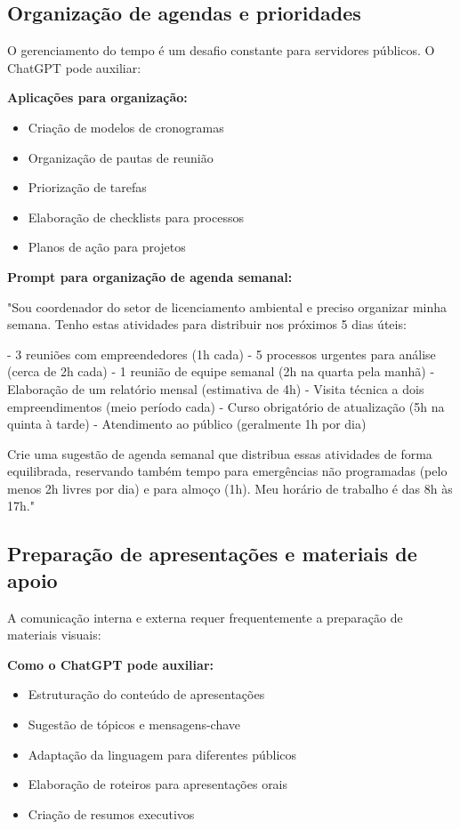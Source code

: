 \documentclass[12pt,a4paper]{book}
\begin{document}
\subsection{Organização de agendas e prioridades}

O gerenciamento do tempo é um desafio constante para servidores públicos. O ChatGPT pode auxiliar:

\textbf{Aplicações para organização:}
\begin{itemize}
    \item Criação de modelos de cronogramas
    \item Organização de pautas de reunião
    \item Priorização de tarefas
    \item Elaboração de checklists para processos
    \item Planos de ação para projetos
\end{itemize}

\begin{tcolorbox}[exemplo]
\textbf{Prompt para organização de agenda semanal:}

"Sou coordenador do setor de licenciamento ambiental e preciso organizar minha semana. Tenho estas atividades para distribuir nos próximos 5 dias úteis:

- 3 reuniões com empreendedores (1h cada)
- 5 processos urgentes para análise (cerca de 2h cada)
- 1 reunião de equipe semanal (2h na quarta pela manhã)
- Elaboração de um relatório mensal (estimativa de 4h)
- Visita técnica a dois empreendimentos (meio período cada)
- Curso obrigatório de atualização (5h na quinta à tarde)
- Atendimento ao público (geralmente 1h por dia)

Crie uma sugestão de agenda semanal que distribua essas atividades de forma equilibrada, reservando também tempo para emergências não programadas (pelo menos 2h livres por dia) e para almoço (1h). Meu horário de trabalho é das 8h às 17h."
\end{tcolorbox}

\subsection{Preparação de apresentações e materiais de apoio}

A comunicação interna e externa requer frequentemente a preparação de materiais visuais:

\textbf{Como o ChatGPT pode auxiliar:}
\begin{itemize}
    \item Estruturação do conteúdo de apresentações
    \item Sugestão de tópicos e mensagens-chave
    \item Adaptação da linguagem para diferentes públicos
    \item Elaboração de roteiros para apresentações orais
    \item Criação de resumos executivos
\end{itemize}
\end{document}
